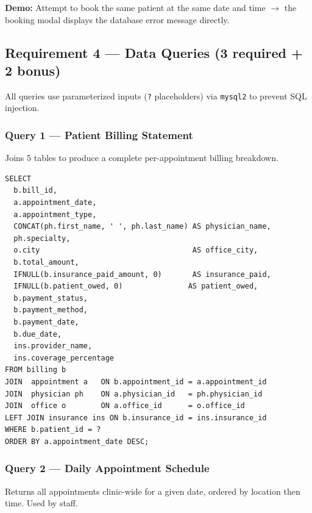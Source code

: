 \documentclass[12pt, letterpaper]{article}
\begin{document}
\textbf{Demo:} Attempt to book the same patient at the same date and time $\rightarrow$ the booking modal displays the database error message directly.

\subsection{Requirement 4 — Data Queries (3 required + 2 bonus)}

\begin{greenbox}
All queries use parameterized inputs (\texttt{?} placeholders) via \texttt{mysql2} to prevent SQL injection.
\end{greenbox}

\subsubsection{Query 1 — Patient Billing Statement}

Joins 5 tables to produce a complete per-appointment billing breakdown.

\begin{lstlisting}[language=MySQL, caption={Query 1: Patient Billing Statement}]
SELECT
  b.bill_id,
  a.appointment_date,
  a.appointment_type,
  CONCAT(ph.first_name, ' ', ph.last_name) AS physician_name,
  ph.specialty,
  o.city                                   AS office_city,
  b.total_amount,
  IFNULL(b.insurance_paid_amount, 0)       AS insurance_paid,
  IFNULL(b.patient_owed, 0)               AS patient_owed,
  b.payment_status,
  b.payment_method,
  b.payment_date,
  b.due_date,
  ins.provider_name,
  ins.coverage_percentage
FROM billing b
JOIN  appointment a   ON b.appointment_id = a.appointment_id
JOIN  physician ph    ON a.physician_id   = ph.physician_id
JOIN  office o        ON a.office_id      = o.office_id
LEFT JOIN insurance ins ON b.insurance_id = ins.insurance_id
WHERE b.patient_id = ?
ORDER BY a.appointment_date DESC;
\end{lstlisting}

\subsubsection{Query 2 — Daily Appointment Schedule}

Returns all appointments clinic-wide for a given date, ordered by location then time. Used by staff.
\end{document}
